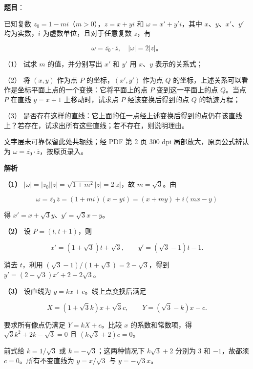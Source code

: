 \begin{answer}

\textbf{题目}：

已知复数 $z_0=1-mi$（$m>0$），$z=x+yi$ 和 $\omega=x'+y'i$，其中 $x$、$y$、$x'$、$y'$ 均为实数，$i$ 为虚数单位，且对于任意复数 $z$，有

\nopagebreak[4]
\[
\omega=\overline{z_0}\cdot\overline z,\quad |\omega|=2|z|\mbox{。}
\]

（1） 试求 $m$ 的值，并分别写出 $x'$ 和 $y'$ 用 $x$、$y$ 表示的关系式；

（2） 将 $(x,y)$ 作为点 $P$ 的坐标，$(x',y')$ 作为点 $Q$ 的坐标，上述关系可以看作是坐标平面上点的一个变换：它将平面上的点 $P$ 变到这一平面上的点 $Q$。当点 $P$ 在直线 $y=x+1$ 上移动时，试求点 $P$ 经该变换后得到的点 $Q$ 的轨迹方程；

（3） 是否存在这样的直线：它上面的任一点经上述变换后得到的点仍在该直线上？若存在，试求出所有这些直线；若不存在，则说明理由。

\begin{gktip}
文字层未可靠保留此处共轭线；经 PDF 第 2 页 300 dpi 局部放大，原页公式辨认为 $\omega=\overline{z_0}\cdot\overline z$，按原页录入。
\end{gktip}

\textbf{解析}

\textbf{（1）} $|\omega|=|z_0||z|=\sqrt{1+m^2}|z|=2|z|$，故 $m=\sqrt3$。由

\nopagebreak[4]
\[
\omega=\overline{z_0}\,\overline z
=(1+mi)(x-yi)
=(x+my)+i(mx-y)
\]

得 $x'=x+\sqrt3y$、$y'=\sqrt3x-y$。

\textbf{（2）} 设 $P=(t,t+1)$，则

\nopagebreak[4]
\[
x'=(1+\sqrt3)t+\sqrt3,\qquad y'=(\sqrt3-1)t-1.
\]

消去 $t$，利用 $(\sqrt3-1)/(1+\sqrt3)=2-\sqrt3$，得到 $y'=(2-\sqrt3)x'+2-2\sqrt3$。

\textbf{（3）} 设直线为 $y=kx+c$。线上点变换后满足

\nopagebreak[4]
\[
X=(1+\sqrt3k)x+\sqrt3c,\qquad Y=(\sqrt3-k)x-c.
\]

要求所有像点仍满足 $Y=kX+c$。比较 $x$ 的系数和常数项，得 $\sqrt3k^2+2k-\sqrt3=0$ 且 $(k\sqrt3+2)c=0$。

前式给 $k=1/\sqrt3$ 或 $k=-\sqrt3$；这两种情况下 $k\sqrt3+2$ 分别为 $3$ 和 $-1$，故都须 $c=0$。所有不变直线为 $y=x/\sqrt3$ 与 $y=-\sqrt3x$。




\end{answer}